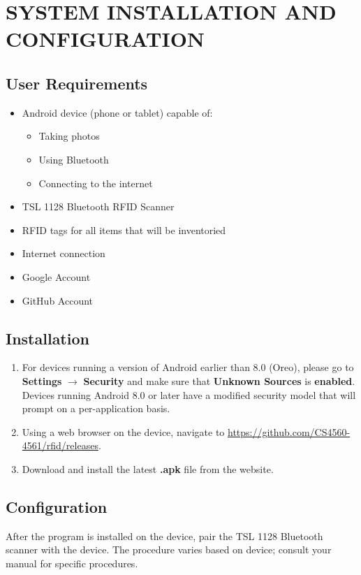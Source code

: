 \chapter{SYSTEM INSTALLATION AND CONFIGURATION}

\section{User Requirements}
\begin{itemize}
	\item Android device (phone or tablet) capable of:
	\begin{itemize}
		\item Taking photos
		\item Using Bluetooth
		\item Connecting to the internet
	\end{itemize}
	\item TSL 1128 Bluetooth\textsuperscript{\textregistered} RFID Scanner
	\item RFID tags for all items that will be inventoried
	\item Internet connection
	\item Google Account
	\item GitHub Account
\end{itemize}

\section{Installation}
\begin{enumerate}
	\item For devices running a version of Android earlier than 8.0 (Oreo),
please go to \textbf{Settings} $\rightarrow$ \textbf{Security} and make sure that \textbf{Unknown Sources} is \textbf{enabled}.
Devices running Android 8.0 or later have a modified security model that will prompt on a per-application basis.

	\item Using a web browser on the device, navigate to \url{https://github.com/CS4560-4561/rfid/releases}.
	
	\item Download and install the latest \textbf{.apk} file from the website.
\end{enumerate}

\clearpage
\section{Configuration}
After the program is installed on the device, pair the TSL 1128 Bluetooth scanner with the device.
The procedure varies based on device; consult your manual for specific procedures. \\

